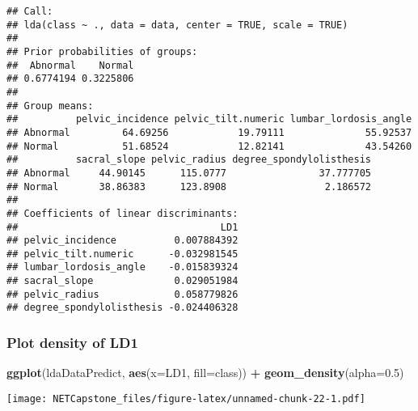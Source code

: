 \documentclass[
]{article}
\newenvironment{Shaded}{\begin{snugshade}}{\end{snugshade}}
\newcommand{\CommentTok}[1]{\textcolor[rgb]{0.56,0.35,0.01}{\textit{#1}}}
\newcommand{\DataTypeTok}[1]{\textcolor[rgb]{0.13,0.29,0.53}{#1}}
\newcommand{\FloatTok}[1]{\textcolor[rgb]{0.00,0.00,0.81}{#1}}
\newcommand{\KeywordTok}[1]{\textcolor[rgb]{0.13,0.29,0.53}{\textbf{#1}}}
\newcommand{\NormalTok}[1]{#1}
\newcommand{\OperatorTok}[1]{\textcolor[rgb]{0.81,0.36,0.00}{\textbf{#1}}}
\newcommand{\StringTok}[1]{\textcolor[rgb]{0.31,0.60,0.02}{#1}}
\begin{document}
\begin{verbatim}
## Call:
## lda(class ~ ., data = data, center = TRUE, scale = TRUE)
## 
## Prior probabilities of groups:
##  Abnormal    Normal 
## 0.6774194 0.3225806 
## 
## Group means:
##          pelvic_incidence pelvic_tilt.numeric lumbar_lordosis_angle
## Abnormal         64.69256            19.79111              55.92537
## Normal           51.68524            12.82141              43.54260
##          sacral_slope pelvic_radius degree_spondylolisthesis
## Abnormal     44.90145      115.0777                37.777705
## Normal       38.86383      123.8908                 2.186572
## 
## Coefficients of linear discriminants:
##                                   LD1
## pelvic_incidence          0.007884392
## pelvic_tilt.numeric      -0.032981545
## lumbar_lordosis_angle    -0.015839324
## sacral_slope              0.029051984
## pelvic_radius             0.058779826
## degree_spondylolisthesis -0.024406328
\end{verbatim}

\begin{Shaded}
\end{Shaded}

\hypertarget{plot-density-of-ld1}{%
\subsubsection{Plot density of LD1}\label{plot-density-of-ld1}}

\begin{Shaded}
\begin{Highlighting}[]
\KeywordTok{ggplot}\NormalTok{(ldaDataPredict, }\KeywordTok{aes}\NormalTok{(}\DataTypeTok{x=}\NormalTok{LD1, }\DataTypeTok{fill=}\NormalTok{class)) }\OperatorTok{+}\StringTok{ }\KeywordTok{geom_density}\NormalTok{(}\DataTypeTok{alpha=}\FloatTok{0.5}\NormalTok{)}
\end{Highlighting}
\end{Shaded}

\texttt{[image: NETCapstone\_files/figure-latex/unnamed-chunk-22-1.pdf]}
\end{document}
